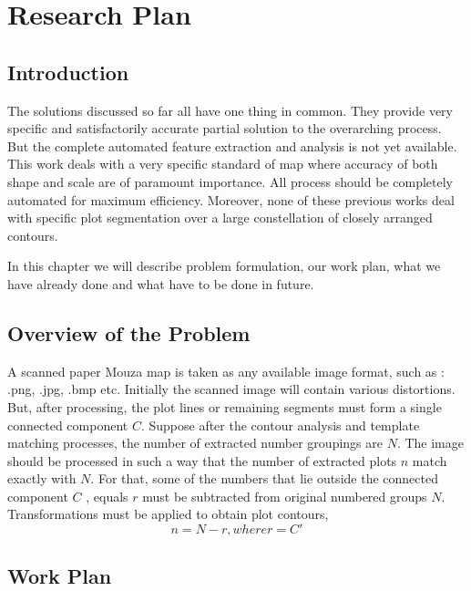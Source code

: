 
\usetikzlibrary{shapes,arrows}
\pagestyle{empty}

\chapter{Research Plan} \label{plan}

\section{Introduction}

The solutions discussed so far all have one thing in common. They provide very specific and satisfactorily accurate partial solution to the overarching process. But the complete automated feature extraction and analysis is not yet available. This work deals with a very specific standard of map where accuracy of both shape and scale are of paramount importance. All process should be completely automated for maximum efficiency. Moreover, none of these previous works deal with specific plot segmentation over a large constellation of closely arranged contours.

In this chapter we will describe problem formulation, our work plan, what we have already done and what have to be done in future. 

\section{Overview of the Problem}

A scanned paper Mouza map is taken as any available image format, such as : .png, .jpg, .bmp etc. Initially the scanned image will contain various distortions. But, after processing, the plot lines or remaining segments must form a single connected component ${C}$. Suppose after the contour analysis and template matching processes, the number of extracted number groupings are ${N}$. The image should be processed in such a way that the number of extracted plots ${n}$ match exactly with ${N}$. For that, some of the numbers that lie outside the connected component ${C}$ , equals ${r}$ must be subtracted from original numbered groups ${N}$. Transformations must be applied to obtain plot contours,
\begin{equation}
n=N-r, where r=C'
\end{equation}


\section{Work Plan}\label{todo}


